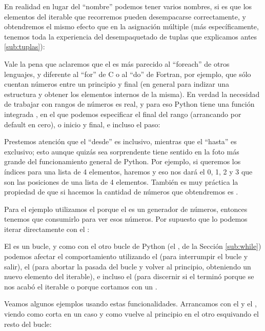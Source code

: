 En realidad en lugar del ``nombre'' podemos tener varios nombres, si es que los elementos del iterable que recorremos pueden desempacarse correctamente, y obtendremos el mismo efecto que en la asignación múltiple (más específicamente, tenemos toda la experiencia del desempaquetado de tuplas que explicamos antes \ref{sub:tuplas}):


Vale la pena que aclaremos que el  es más parecido al ``foreach'' de otros lenguajes, y diferente al ``for'' de C o al ``do'' de Fortran, por ejemplo, que sólo cuentan números entre un principio y final (en general para indizar una estructura y obtener los elementos internos de la misma). En verdad la necesidad de trabajar con rangos de números es real, y para eso Python tiene una función integrada , en el que podemos especificar el final del rango (arrancando por default en cero), o inicio y final, e incluso el paso:


Prestemos atención que el ``desde'' es inclusivo, mientras que el ``hasta'' es exclusivo; esto aunque quizás sea sorprendente tiene sentido en la foto más grande del funcionamiento general de Python. Por ejemplo, si queremos los índices para una lista de 4 elementos, haremos  y eso nos dará el 0, 1, 2 y 3 que son las posiciones de una lista de 4 elementos. También es muy práctica la propiedad de que si hacemos  la cantidad de números que obtendremos es .

Para el ejemplo utilizamos el  porque el  es un generador de números, entonces tenemos que consumirlo para ver esos números. Por supuesto que lo podemos iterar directamente con el :


El  es un bucle, y como con el otro bucle de Python (el , de la Sección \ref{sub:while}) podemos afectar el comportamiento utilizando el  (para interrumpir el bucle y salir), el  (para abortar la pasada del bucle y volver al principio, obteniendo un nuevo elemento del iterable), e incluso el  (para discernir si el  terminó porque se nos acabó el iterable o porque cortamos con un .

Veamos algunos ejemplos usando estas funcionalidades. Arrancamos con el  y el , viendo como corta en un caso y como vuelve al principio en el otro esquivando el resto del bucle:

